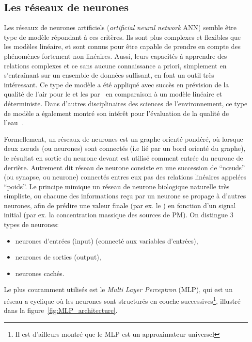 \subsection{Les réseaux de neurones}%
\label{sub:les_réseaux_de_neurones}

Les réseaux de neurones artificiels (\textit{artificial neural network} ANN) semble être
type de modèle répondant à ces critères. Ils sont plus complexes et flexibles que les
modèles linéaire, et sont connus pour être capable de prendre en compte des phénomènes
fortement non linéaires. Aussi, leurs capacités à apprendre des relations complexes et ce
sans aucune connaissance a priori, simplement en s'entraînant sur un ensemble de données
suffisant, en font un outil très intéressant.
Ce type de modèle a été appliqué avec succès en prévision de la qualité de l'air pour le
 et les \PMdix{} par~\cite{kukkonenExtensive2003} en comparaison à un modèle
linéaire et déterministe. Dans d'autres disciplinaires des sciences de l'environnement, ce
type de modèle a également montré son intérêt pour l'évaluation de la qualité de
l'eau~\autocite{nathanApplication2017}.

Formellement, un réseaux de neurones est un graphe orienté pondéré, où lorsque deux
nœuds (ou neurones) sont connectés (i.e lié par un bord orienté du graphe), le résultat en
sortie du neurone devant est utilisé comment entrée du neurone de derrière.
Autrement dit réseau de neurone consiste en une succession de ``nœuds'' (ou synapse, ou
neurone) connectés entres eux pas des relations linéaires appelées ``poids''. Le principe
mimique un réseau de neurone biologique naturelle très simpliste, ou chacune des
informations reçu par un neurone se propage à d'autres neurones, afin de prédire une
valeur finale (par ex. le \POv) en fonction d'un signal initial (par ex. la
concentration massique des sources de PM).
On distingue 3 types de neurones:
\begin{itemize}
    \item neurones d'entrées (input) (connecté aux variables d'entrées),
    \item neurones de sorties (output),
    \item neurones cachés.
\end{itemize}
Le plus couramment utilisés est le \textit{Multi Layer Perceptron} (MLP), qui est un
réseau a-cyclique où les neurones sont structurés en couche successives\footnote{Il est
d'ailleurs montré que le MLP est un approximateur universel}, illustré dans la
figure~\ref{fig:MLP_architecture}.

